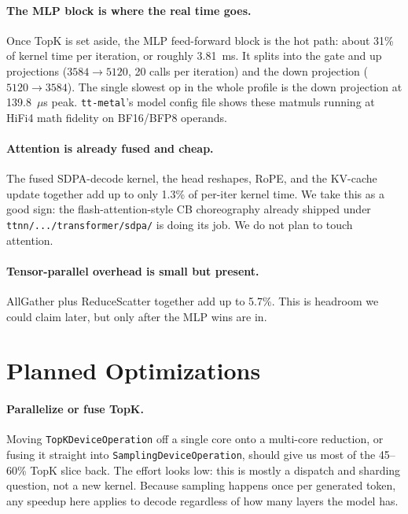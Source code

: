 \documentclass[sigplan,nonacm,review]{acmart}
\begin{document}
\paragraph{The MLP block is where the real time goes.}
Once TopK is set aside, the MLP feed-forward block is the hot path:
about 31\% of kernel time per iteration, or roughly 3.81~ms. It splits
into the gate and up projections ($3584 \!\to\! 5120$, 20 calls per
iteration) and the down projection ($5120 \!\to\! 3584$). The single
slowest op in the whole profile is the down projection at 139.8~$\mu$s
peak. \texttt{tt-metal}'s model config file shows these matmuls running
at HiFi4 math fidelity on BF16/BFP8 operands.

\paragraph{Attention is already fused and cheap.}
The fused SDPA-decode kernel, the head reshapes, RoPE, and the
KV-cache update together add up to only 1.3\% of per-iter kernel time.
We take this as a good sign: the flash-attention-style CB choreography
already shipped under \texttt{ttnn/.../transformer/sdpa/} is doing its
job. We do not plan to touch attention.

\paragraph{Tensor-parallel overhead is small but present.}
AllGather plus ReduceScatter together add up to 5.7\%. This is headroom
we could claim later, but only after the MLP wins are in.

\section{Planned Optimizations}
\label{sec:opts}

\paragraph{Parallelize or fuse TopK.} Moving
\texttt{TopKDeviceOperation} off a single core onto a multi-core
reduction, or fusing it straight into
\texttt{SamplingDeviceOperation}, should give us most of the 45--60\%
TopK slice back. The effort looks low: this is mostly a dispatch and
sharding question, not a new kernel. Because sampling happens
once per generated token, any speedup here applies to decode regardless
of how many layers the model has.
\end{document}
